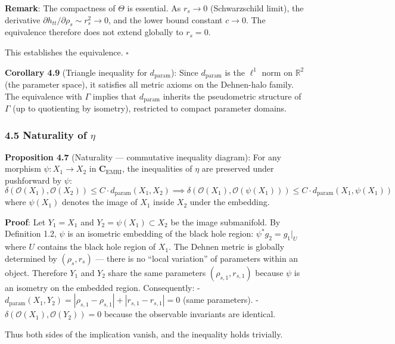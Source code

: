 \documentclass[
]{article}
\begin{document}
\textbf{Remark}: The compactness of \(\Theta\) is essential. As
\(r_s \to 0\) (Schwarzschild limit), the derivative
\(\partial h_{tt}/\partial\rho_s \sim r_s^2 \to 0\), and the lower bound
constant \(c \to 0\). The equivalence therefore does not extend globally
to \(r_s = 0\).

This establishes the equivalence. \(\square\)

\textbf{Corollary 4.9} (Triangle inequality for \(d_{\text{param}}\)):
Since \(d_{\text{param}}\) is the \(\ell^1\) norm on \(\mathbb{R}^2\)
(the parameter space), it satisfies all metric axioms on the Dehnen-halo
family. The equivalence with \(\Gamma\) implies that
\(d_{\text{param}}\) inherits the pseudometric structure of \(\Gamma\)
(up to quotienting by isometry), restricted to compact parameter
domains.

\subsubsection{\texorpdfstring{4.5 Naturality of
\(\eta\)}{4.5 Naturality of \textbackslash eta}}\label{naturality-of-eta}

\textbf{Proposition 4.7} (Naturality --- commutative inequality
diagram): For any morphism \(\psi: X_1 \to X_2\) in
\(\mathbf{C}_{\text{EMRI}}\), the inequalities of \(\eta\) are preserved
under pushforward by \(\psi\):
\[\delta(\mathcal{O}(X_1), \mathcal{O}(X_2)) \leq C \cdot d_{\text{param}}(X_1, X_2) \implies \delta(\mathcal{O}(X_1), \mathcal{O}(\psi(X_1))) \leq C \cdot d_{\text{param}}(X_1, \psi(X_1))\]
where \(\psi(X_1)\) denotes the image of \(X_1\) inside \(X_2\) under
the embedding.

\textbf{Proof}: Let \(Y_1 = X_1\) and \(Y_2 = \psi(X_1) \subset X_2\) be
the image submanifold. By Definition 1.2, \(\psi\) is an isometric
embedding of the black hole region: \(\psi^* g_2 = g_1|_U\) where \(U\)
contains the black hole region of \(X_1\). The Dehnen metric is globally
determined by \((\rho_s, r_s)\) --- there is no ``local variation'' of
parameters within an object. Therefore \(Y_1\) and \(Y_2\) share the
same parameters \((\rho_{s,1}, r_{s,1})\) because \(\psi\) is an
isometry on the embedded region. Consequently: -
\(d_{\text{param}}(X_1, Y_2) = |\rho_{s,1} - \rho_{s,1}| + |r_{s,1} - r_{s,1}| = 0\)
(same parameters). - \(\delta(\mathcal{O}(X_1), \mathcal{O}(Y_2)) = 0\)
because the observable invariants are identical.

Thus both sides of the implication vanish, and the inequality holds
trivially.
\end{document}
